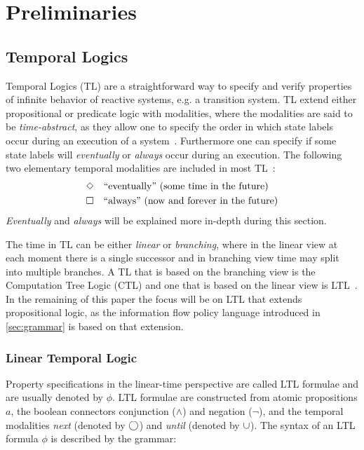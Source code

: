 \section{Preliminaries}\label{sec:preliminaries}
\subsection{Temporal Logics}
Temporal Logics (TL) are a straightforward way to specify and verify properties of infinite behavior of reactive systems, e.g. a transition system. TL extend either propositional or predicate logic with modalities, where the modalities are said to be \emph{time-abstract}, as they allow one to specify the order in which state labels occur during an execution of a system~\cite{baier2008principles}. Furthermore one can specify if some state labels will \emph{eventually} or \emph{always} occur during an execution. The following two elementary temporal modalities are included in most TL~\cite{baier2008principles}:
\begin{align*}
    &\Diamond \quad \text{``eventually'' (some time in the future)}\\
    &\square \quad \text{``always'' (now and forever in the future)}
\end{align*}
\emph{Eventually} and \emph{always} will be explained more in-depth during this section. 

The time in TL can be either \emph{linear} or \emph{branching}, where in the linear view at each moment there is a single successor and in branching view time may split into multiple branches. A TL that is based on the branching view is the Computation Tree Logic (CTL) and one that is based on the linear view is LTL~\cite{baier2008principles}. In the remaining of this paper the focus will be on LTL that extends propositional logic, as the information flow policy language introduced in \autoref{sec:grammar} is based on that extension.

\subsubsection{Linear Temporal Logic}\label{sec:ltl}
Property specifications in the linear-time perspective are called LTL formulae and are usually denoted by $\phi$. LTL formulae are constructed from atomic propositions $a$, the boolean connectors conjunction ($\land$) and negation ($\lnot$), and the temporal modalities \emph{next} (denoted by $\bigcirc$) and \emph{until} (denoted by $\cup$). The syntax of an LTL formula $\phi$ is described by the grammar:

